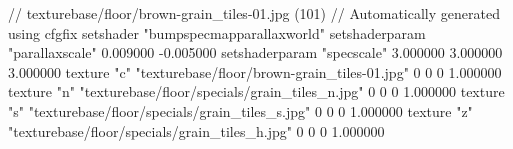 // texturebase/floor/brown-grain_tiles-01.jpg (101)
// Automatically generated using cfgfix
setshader "bumpspecmapparallaxworld"
setshaderparam "parallaxscale" 0.009000 -0.005000
setshaderparam "specscale" 3.000000 3.000000 3.000000
texture "c" "texturebase/floor/brown-grain_tiles-01.jpg" 0 0 0 1.000000
texture "n" "texturebase/floor/specials/grain_tiles_n.jpg" 0 0 0 1.000000
texture "s" "texturebase/floor/specials/grain_tiles_s.jpg" 0 0 0 1.000000
texture "z" "texturebase/floor/specials/grain_tiles_h.jpg" 0 0 0 1.000000
